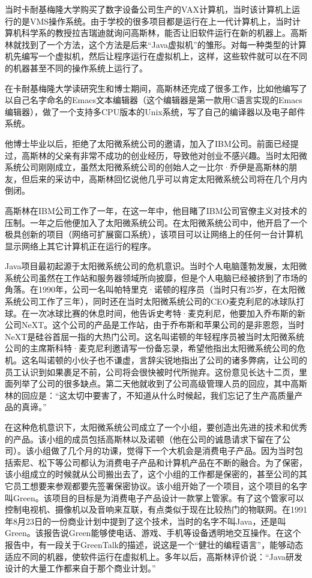 \documentclass[
  letterpaper,
  DIV=11,
  numbers=noendperiod]{scrreprt}
\begin{document}
当时卡耐基梅隆大学购买了数字设备公司生产的VAX计算机，当时该计算机上运行的是VMS操作系统。由于学校的很多项目都是运行在上一代计算机上，当时计算机科学系的教授拉吉瑞迪就询问高斯林，能否让旧软件运行在新的机器上。高斯林就找到了一个方法，这个方法是后来``Java虚拟机''的雏形。对每一种类型的计算机先编写一个虚拟机，然后让程序运行在虚拟机上，这样，这些软件就可以在不同的机器甚至不同的操作系统上运行了。

在卡耐基梅隆大学读研究生和博士期间，高斯林还完成了很多工作，比如他编写了以自己名字命名的Emacs文本编辑器（这个编辑器是第一款用C语言实现的Emacs编辑器），做了一个支持多CPU版本的Unix系统，写了自己的编译器以及电子邮件系统。

他博士毕业以后，拒绝了太阳微系统公司的邀请，加入了IBM公司。前面已经提过，高斯林的父亲有非常不成功的创业经历，导致他对创业不感兴趣。当时太阳微系统公司刚刚成立，虽然太阳微系统公司的创始人之一比尔·乔伊是高斯林的朋友，但后来的采访中，高斯林回忆说他几乎可以肯定太阳微系统公司将在几个月内倒闭。

高斯林在IBM公司工作了一年，在这一年中，他目睹了IBM公司官僚主义对技术的压制。一年之后他便加入了太阳微系统公司。在太阳微系统公司中，他开启了一个极具创新的项目（网络可扩展窗口系统），该项目可以让网络上的任何一台计算机显示网络上其它计算机正在运行的程序。

Java项目最初起源于太阳微系统公司的危机意识。当时个人电脑蓬勃发展，太阳微系统公司虽然在工作站和服务器领域所向披靡，但是个人电脑已经被挤到了市场的角落。在1990年，公司一名叫帕特里克·诺顿的程序员（当时只有25岁，在太阳微系统公司工作了三年），同时还在当时太阳微系统公司的CEO麦克利尼的冰球队打球。在一次冰球比赛的休息时间，他告诉史考特·麦克利尼，他要加入乔布斯的新公司NeXT。这个公司的产品是工作站，由于乔布斯和苹果公司的是非恩怨，当时NeXT是硅谷首屈一指的大热门公司。这名叫诺顿的年轻程序员被当时太阳微系统公司的主席斯科特·麦克尼利邀请写一份备忘录，希望他指出太阳微系统公司的危机。这名叫诺顿的小伙子也不谦虚，言辞尖锐地指出了公司的诸多弊病，让公司的员工认识到如果裹足不前，公司将会很快被时代所抛弃。这份意见长达十二页，里面列举了公司的很多缺点。第二天他就收到了公司高级管理人员的回应，其中高斯林的回应是：``这太切中要害了，不知道从什么时候起，我们忘记了生产高质量产品的真谛。''

在这种危机意识下，太阳微系统公司成立了一个小组，要创造出先进的技术和优秀的产品。该小组的成员包括高斯林以及诺顿（他在公司的诚恳请求下留在了公司）。该小组做了几个月的功课，觉得下一个大机会是消费电子产品。因为当时包括索尼、松下等公司都认为消费电子产品和计算机产品在不断的融合。为了保密，该小组成立的时候就从公司搬出去了，这个小组的工作都是保密的，甚至公司的其它员工想要来参观都要先签署保密协议。该小组开始了一个项目，这个项目的名字叫Green。该项目的目标是为消费电子产品设计一款掌上管家。有了这个管家可以控制电视机、摄像机以及音响来互联，有点类似于现在比较热门的物联网。在1991年8月23日的一份商业计划中提到了这个技术，当时的名字不叫Java，还是叫Green。该报告说Green能够使电话、游戏、手机等设备透明地交互操作。在这个报告中，有一段关于GreenTalk的描述，说这是一个``健壮的编程语言''，能够动态适应不同的机器，使软件运行在虚拟机上。多年以后，高斯林评价说：``Java研发设计的大量工作都来自于那个商业计划。''
\end{document}
